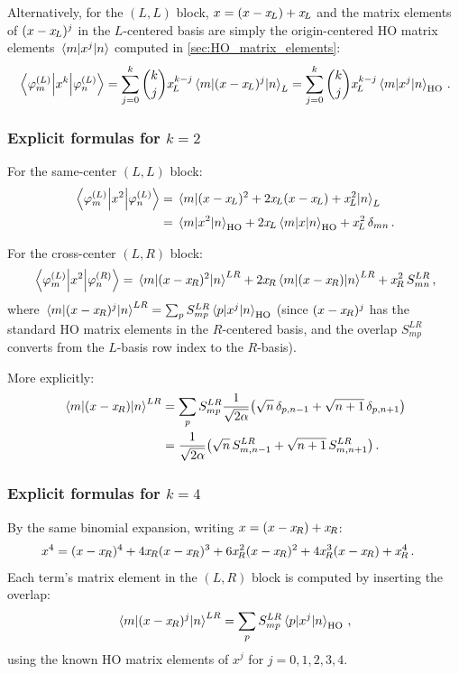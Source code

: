 Alternatively, for the $(L,L)$ block, $x = (x-x_{\!L}) + x_{\!L}$ and the matrix elements of
$(x-x_{\!L})^j$ in the $L$-centered basis are simply the origin-centered HO matrix elements
$\mel{m}{x^j}{n}$ computed in \cref{sec:HO_matrix_elements}:
\begin{equation}
  \mel{\varphi_m^{(L)}}{x^k}{\varphi_n^{(L)}}
  = \sum_{j=0}^{k}\binom{k}{j}x_{\!L}^{k-j}\mel{m}{(x-x_{\!L})^j}{n}_L
  = \sum_{j=0}^{k}\binom{k}{j}x_{\!L}^{k-j}\mel{m}{x^j}{n}_{\text{HO}}\,.
\end{equation}

\subsubsection{Explicit formulas for $k = 2$}

For the same-center $(L,L)$ block:
\begin{align}
  \mel{\varphi_m^{(L)}}{x^2}{\varphi_n^{(L)}}
  &= \mel{m}{(x-x_{\!L})^2 + 2x_{\!L}(x-x_{\!L}) + x_{\!L}^2}{n}_L\notag\\
  &= \mel{m}{x^2}{n}_{\text{HO}} + 2x_{\!L}\mel{m}{x}{n}_{\text{HO}} + x_{\!L}^2\,\delta_{mn}\,.
\end{align}

For the cross-center $(L,R)$ block:
\begin{equation}
  \mel{\varphi_m^{(L)}}{x^2}{\varphi_n^{(R)}}
  = \mel{m}{(x-x_{\!R})^2}{n}^{LR} + 2x_{\!R}\mel{m}{(x-x_{\!R})}{n}^{LR} + x_{\!R}^2\,S_{mn}^{LR}\,,
\end{equation}
where $\mel{m}{(x-x_{\!R})^j}{n}^{LR} = \sum_p S_{mp}^{LR}\mel{p}{x^j}{n}_{\text{HO}}$ (since
$(x-x_{\!R})^j$ has the standard HO matrix elements in the $R$-centered basis, and the
overlap $S_{mp}^{LR}$ converts from the $L$-basis row index to the $R$-basis).

More explicitly:
\begin{align}
  \mel{m}{(x-x_{\!R})}{n}^{LR} &= \sum_p S_{mp}^{LR}\frac{1}{\sqrt{2\alpha}}\bigl(\sqrt{n}\,\delta_{p,n-1}+\sqrt{n+1}\,\delta_{p,n+1}\bigr)\notag\\
  &= \frac{1}{\sqrt{2\alpha}}\bigl(\sqrt{n}\,S_{m,n-1}^{LR}+\sqrt{n+1}\,S_{m,n+1}^{LR}\bigr)\,.
\end{align}

\subsubsection{Explicit formulas for $k = 4$}

By the same binomial expansion, writing $x = (x-x_{\!R}) + x_{\!R}$:
\begin{align}
  x^4 &= (x-\xR)^4 + 4\xR(x-\xR)^3 + 6\xR^2(x-\xR)^2 + 4\xR^3(x-\xR) + \xR^4\,.
\end{align}
Each term's matrix element in the $(L,R)$ block is computed by inserting the overlap:
\begin{align}
  \mel{m}{(x-x_{\!R})^j}{n}^{LR} = \sum_p S_{mp}^{LR}\mel{p}{x^j}{n}_{\text{HO}}\,,
\end{align}
using the known HO matrix elements of $x^j$ for $j = 0, 1, 2, 3, 4$.


